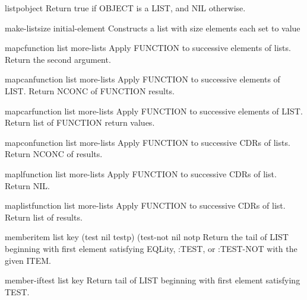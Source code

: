 \begin{function}{listp}{object}{}
  Return true if OBJECT is a LIST, and NIL otherwise.
\end{function}

\begin{function}{make-list}{size \key initial-element}{}
  Constructs a list with size elements each set to value
\end{function}

\begin{function}{mapc}{function list \rest more-lists}{}
  Apply FUNCTION to successive elements of lists. Return the second argument.
\end{function}

\begin{function}{mapcan}{function list \rest more-lists}{}
  Apply FUNCTION to successive elements of LIST. Return NCONC of FUNCTION
   results.
\end{function}

\begin{function}{mapcar}{function list \rest more-lists}{}
  Apply FUNCTION to successive elements of LIST. Return list of FUNCTION
   return values.
\end{function}

\begin{function}{mapcon}{function list \rest more-lists}{}
  Apply FUNCTION to successive CDRs of lists. Return NCONC of results.
\end{function}

\begin{function}{mapl}{function list \rest more-lists}{}
  Apply FUNCTION to successive CDRs of list. Return NIL.
\end{function}

\begin{function}{maplist}{function list \rest more-lists}{}
  Apply FUNCTION to successive CDRs of list. Return list of results.
\end{function}

\begin{function}{member}{item list \key key (test nil testp) (test-not nil notp}{}
  Return the tail of LIST beginning with first element satisfying EQLity,
   :TEST, or :TEST-NOT with the given ITEM.
\end{function}

\begin{function}{member-if}{test list \key key}{}
  Return tail of LIST beginning with first element satisfying TEST.
\end{function}

